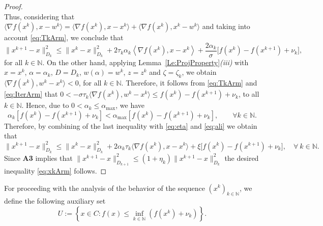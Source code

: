 \begin{proof}
$$	$$
	Thus, considering that $\big\langle \nabla f(x^k), x-w^k\big\rangle = \big\langle \nabla f(x^k), x-x^k\big\rangle + \big\langle \nabla f(x^k), x^k-w^k \big\rangle$ and taking into account \eqref{eq:TkArm}, we conclude that
	\begin{equation} \label{eq;ali}
		\|x^{k+1}-x\|_{D_k}^2 \leq  \|x^k-x\|_{D_k}^2 + 2\tau_k\alpha_k \left\langle \nabla f(x^k),x-x^k\right\rangle + \frac{2 \alpha_k}{\sigma} \big[f(x^k)-f(x^{k+1})+\nu_k\big],
	\end{equation}
	for all $ k \in \mathbb{N}$.  On the other hand, applying Lemma~\ref{Le:ProjProperty}{\it (iii)}  with $x=x^k$, $\alpha=\alpha_k$, $D = D_k$, $w(\alpha) = w^k$, $z = z^k$ and $\zeta= \zeta_k$, we obtain  $\langle \nabla f(x^k), w^k- x^k \rangle <  0$, for all  $ k \in \mathbb{N}$. Therefore, it follows from \eqref{eq:TkArm} and \eqref{eq:IterArm} that $0 < -\sigma\tau_{k} \big\langle \nabla f(x^{k}), w^{k}-x^{k} \big\rangle \leq f(x^{k}) - f(x^{k+1})+\nu_k$, to all $k \in \mathbb{N}$. Hence, due to $0< \alpha_k\leq  \alpha_{\max}$,  we have
	$$
		\alpha_k[f(x^k)-f(x^{k+1})+\nu_k] < \alpha_{\max} [f(x^k)-f(x^{k+1})+\nu_k], \qquad \forall k \in \mathbb{N}.
	$$
	{Therefore, by combining  of the  last inequality with \eqref{eq:eta} and  \eqref{eq;ali} we obtain that
	$$
		\|x^{k+1}-x\|_{D_k}^2 \leq \|x^k-x\|_{D_k}^2 + 2\alpha_k\tau_k \big\langle \nabla f(x^k), x-x^k\big\rangle + \xi \big[f(x^k) - f(x^{k+1})+ \nu_k \big], \quad \forall ~k \in \mathbb{N}.
	$$
	Since {\bf A3}  implies that $\|x^{k+1}-x\|_{D_{k+1}}^2\leq (1+\eta_k) \|x^{k+1}-x\|_{D_k}^2$ the desired inequality \eqref{eq:xkArm} follows.}
\end{proof}

For proceeding with the analysis of  the behavior of the sequence $(x^k)_{k\in\mathbb{N}}$,  we define the following auxiliary set
\begin{equation*}\label{eq:SetTArm}
	U := \left\{x \in C: f(x) \leq \inf_{k\in {\mathbb N}}\left(f(x^{k})+\nu_k\right) \right\}.
\end{equation*}

